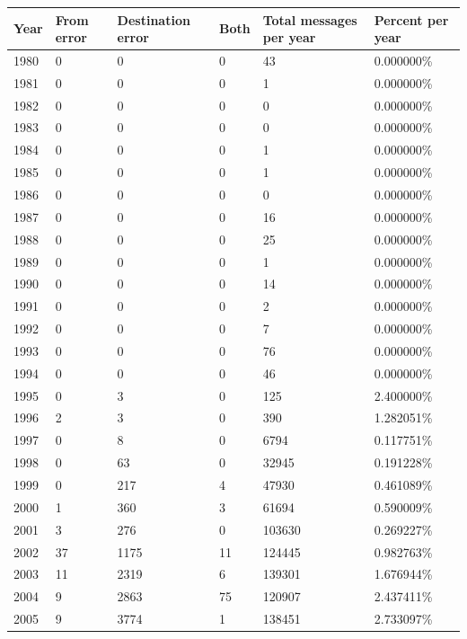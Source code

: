 \documentclass[a4paper,english]{report}
\begin{document}
\begin{center}
\begin{table}[H]
\begin{tabular}{||p{1.2cm}|p{1.2cm}|p{1.7cm}|p{1.5cm}|p{1.5cm}| p{2.5cm} ||} 
 \hline
 Year & From error & Destination error & Both & Total messages per year& Percent per year\\ [1ex] 
 \hline\hline
1980 & 0 & 0 & 0 & 43 & 0.000000\%\\
\hline
1981 & 0 & 0 & 0 & 1 & 0.000000\%\\
\hline
1982 & 0 & 0 & 0 & 0 & 0.000000\%\\
\hline
1983 & 0 & 0 & 0 & 0 & 0.000000\%\\
\hline
1984 & 0 & 0 & 0 & 1 & 0.000000\%\\
\hline
1985 & 0 & 0 & 0 & 1 & 0.000000\%\\
\hline
1986 & 0 & 0 & 0 & 0 & 0.000000\%\\
\hline
1987 & 0 & 0 & 0 & 16 & 0.000000\%\\
\hline
1988 & 0 & 0 & 0 & 25 & 0.000000\%\\
\hline
1989 & 0 & 0 & 0 & 1 & 0.000000\%\\
\hline
1990 & 0 & 0 & 0 & 14 & 0.000000\%\\
\hline
1991 & 0 & 0 & 0 & 2 & 0.000000\%\\
\hline
1992 & 0 & 0 & 0 & 7 & 0.000000\%\\
\hline
1993 & 0 & 0 & 0 & 76 & 0.000000\%\\
\hline
1994 & 0 & 0 & 0 & 46 & 0.000000\%\\
\hline
1995 & 0 & 3 & 0 & 125 & 2.400000\%\\
\hline
1996 & 2 & 3 & 0 & 390 & 1.282051\%\\
\hline
1997 & 0 & 8 & 0 & 6794 & 0.117751\%\\
\hline
1998 & 0 & 63 & 0 & 32945 & 0.191228\%\\
\hline
1999 & 0 & 217 & 4 & 47930 & 0.461089\%\\
\hline
2000 & 1 & 360 & 3 & 61694 & 0.590009\%\\
\hline
2001 & 3 & 276 & 0 & 103630 & 0.269227\%\\
\hline
2002 & 37 & 1175 & 11 & 124445 & 0.982763\%\\
\hline
2003 & 11 & 2319 & 6 & 139301 & 1.676944\%\\
\hline
2004 & 9 & 2863 & 75 & 120907 & 2.437411\%\\
\hline
2005 & 9 & 3774 & 1 & 138451 & 2.733097\%\\

\end{tabular}
\end{table}
\end{center}
\end{document}
